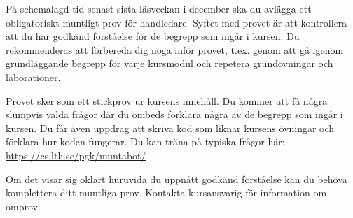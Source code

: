 På schemalagd tid senast sista läsveckan i december ska du avlägga ett obligatoriskt muntligt prov för handledare. Syftet med provet är att kontrollera att du har godkänd förståelse för de begrepp som ingår i kursen. Du rekommenderas att förbereda dig noga inför provet, t.ex. genom att gå igenom grundläggande begrepp för varje kursmodul och repetera grundövningar och laborationer.

Provet sker som ett stickprov ur kursens innehåll. Du kommer att få några slumpvis valda frågor där du ombeds förklara några av de begrepp som ingår i kursen. Du får även uppdrag att skriva kod som liknar kursens övningar och förklara hur koden fungerar. Du kan träna på typiska frågor här: \url{https://cs.lth.se/pgk/muntabot/}

Om det visar sig oklart huruvida du uppnått godkänd förståelse kan du behöva komplettera ditt muntliga prov. Kontakta kursansvarig för information om omprov.  
